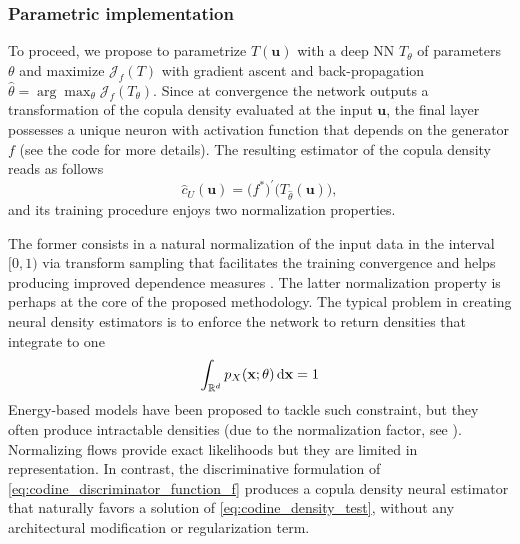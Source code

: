 \subsubsection{Parametric implementation}
\label{subsec:codine_implementation}
To proceed, we propose to parametrize $T(\mathbf{u})$ with a deep NN $T_{\theta}$ of parameters $\theta$ and maximize $\mathcal{J}_{f}(T)$ with gradient ascent and back-propagation $\hat{\theta} = \arg \max_{\theta} \mathcal{J}_f(T_{\theta})$.
Since at convergence the network outputs a transformation of the copula density evaluated at the input $\mathbf{u}$, the final layer possesses a unique neuron with activation function that depends on the generator $f$ (see the code \cite{CODINE_github} for more details).
The resulting estimator of the copula density reads as follows
\begin{equation}
\hat{c}_U(\mathbf{u}) = \bigl(f^{*}\bigr)^{\prime} \bigl(T_{\hat{\theta}}(\mathbf{u})\bigr),
\end{equation}
and its training procedure enjoys two normalization properties. 

The former consists in a natural normalization of the input data in the interval $[0,1)$ via transform sampling that facilitates the training convergence and helps producing improved dependence measures \cite{Poczos2012}. The latter normalization property is perhaps at the core of the proposed methodology. The typical problem in creating neural density estimators is to enforce the network to return densities that integrate to one
\begin{equation}
\label{eq:codine_density_test}
\int_{\mathbb{R}^d}{p_X(\mathbf{x};\theta)\mathop{}\!\mathrm{d} \mathbf{x}} = 1
\end{equation}
Energy-based models have been proposed to tackle such constraint, but they often produce intractable densities (due to the normalization factor, see \cite{Papamakarios2015}). Normalizing flows \cite{Rezende2015} provide exact likelihoods but they are limited in representation. In contrast, the discriminative formulation of \eqref{eq:codine_discriminator_function_f} produces a copula density neural estimator that naturally favors a solution of \eqref{eq:codine_density_test}, without any architectural modification or regularization term.

